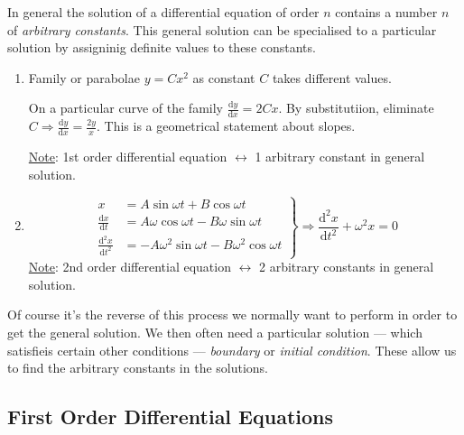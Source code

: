 \documentclass[12pt]{report}
\theoremstyle{definition}
\begin{document}
In general the solution of a differential equation of order $n$
contains a number $n$ of \emph{arbitrary constants}. 
This general solution can be specialised to a particular solution by
assigninig definite values to these constants.

\begin{ex}
    \;

\begin{enumerate}[label = (\alph*)]
    \item Family or parabolae $y = Cx^{2}$ as constant $C$ takes different values.

        On a particular curve of the family $\frac{\mathrm{d}y}{\mathrm{d}x} = 2Cx$.
        By substitutiion, eliminate $C \Rightarrow \frac{\mathrm{d}y}{\mathrm{d}x} = \frac{2y}{x}$.
        This is a geometrical statement about slopes.

        \underline{Note}: 1st order differential equation $\leftrightarrow$ 1 arbitrary constant in general solution.

    \item \[
        \left.
            \begin{align*}
                x &= A\sin{\omega t} + B\cos{\omega t} \\
                \frac{\mathrm{d}x}{\mathrm{d}t} & = A\omega\cos{\omega t} - B\omega\sin{\omega t} \\
                \frac{\mathrm{d}^{2}x}{\mathrm{d}t^{2}}
                                                & = -A\omega^{2}\sin{\omega t} - B\omega^{2}\cos{\omega t}
            \end{align*}
        \right\} \Rightarrow\frac{\mathrm{d}^{2}x}{\mathrm{d}t^{2}} + \omega^{2} x = 0
    \]
    \underline{Note}: 2nd order differential equation $\leftrightarrow$ 2 arbitrary constants in general solution.

\end{enumerate}
    
\end{ex}

Of course it's the reverse of this process we normally want to perform
in order to get the general solution. We then often need a particular solution
--- which satisfieis certain other conditions --- \emph{boundary} or \emph{initial condition}.
These allow us to find the arbitrary constants in the solutions.

\subsection{First Order Differential Equations}
\end{document}
